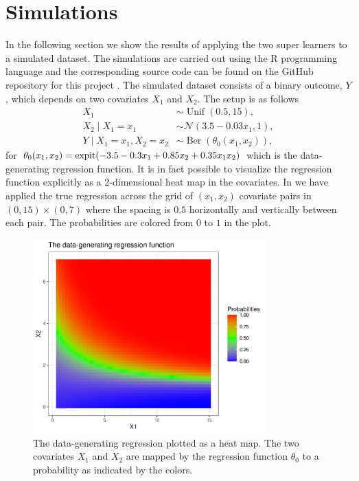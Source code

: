 \documentclass[./main.tex]{subfiles}
\begin{document}
\section{Simulations} \label{sec:simulations}
In the following section we show the results of applying the two super learners to a simulated dataset. The simulations are carried out using the R programming language and the corresponding source code can be found on the GitHub repository for this project \parencite{github}. The simulated dataset consists of a binary outcome, $Y$, which depends on two covariates $X_1$ and $X_2$. The setup is as follows
\begin{align*}
    X_1 &\sim \operatorname{Unif}(0.5, 15),\\
    X_2 \mid X_1 = x_1 &\sim \mathcal{N}(3.5-0.03x_1, 1),\\
    Y \mid X_1 = x_1, X_2 = x_2 &\sim \operatorname{Ber}(\theta_0(x_1, x_2)),
\end{align*}
for $\theta_0(x_1, x_2) = \operatorname{expit}({-3.5 - 0.3x_1 + 0.85x_2 + 0.35x_1x_2})$ which is the data-generating regression function. It is in fact possible to visualize the regression function explicitly as a 2-dimensional heat map in the covariates. In  we have applied the true regression across the grid of $ (x_1, x_2) $ covariate pairs in $ (0, 15) \times (0,7) $ where the spacing is $ 0.5 $ horizontally and vertically between each pair. The probabilities are colored from $ 0 $ to $ 1 $ in the plot. 
\begin{figure}[H]
    \centering
    \includegraphics[width=0.8\textwidth]{figures/trueplot.png}
    \caption{The data-generating regression plotted as a heat map. The two covariates $ X_1 $ and $ X_2 $ are mapped by the regression function $ \theta_0 $ to a probability as indicated by the colors.}
    \label{fig:trueplot}
\end{figure}
\end{document}
